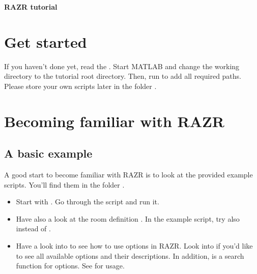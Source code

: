 \documentclass[a4paper, fleqn, 11pt]{article}
\begin{document}
\sffamily
\begin{center}
\LARGE
\textbf{RAZR tutorial}\\[1em]
\normalsize
\end{center}

\vspace{1ex}

\section*{Get started}
If you haven’t done yet, read the . Start MATLAB and change the working directory to the tutorial root directory. Then, run  to add all required paths. Please store your own scripts later in the folder .
\section*{Becoming familiar with RAZR}
\subsection{A basic example}
A good start to become familiar with RAZR is to look at the provided example scripts. You’ll find them in the folder .
\begin{itemize}
  \item Start with . Go through the script and run it.
  \item Have also a look at the room definition . In the example script, try also  instead of .
  \item Have a look into  to see how to use options in RAZR. Look into  if you’d like to see all available options and their descriptions. In addition,  is a search function for options. See  for usage.
\end{itemize}

\end{document}
